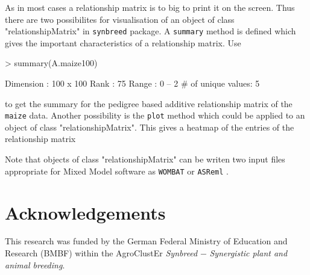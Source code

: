 \documentclass[a4paper,11pt]{article}
\begin{document}
As in most cases a relationship matrix is to big to print it on the screen. Thus there are two possibilites for visualisation of an object of class "relationshipMatrix" in \texttt{synbreed} package. A \texttt{summary} method is defined which gives the important characteristics of a relationship matrix. Use
\begin{Schunk}
\begin{Sinput}
> summary(A.maize100)
\end{Sinput}
\begin{Soutput}
Dimension         : 100 x 100 
Rank              : 75 
Range             : 0 -- 2 
# of unique values: 5 
\end{Soutput}
\end{Schunk}
to get the summary for the pedigree based additive relationship matrix of the \texttt{maize} data. Another possibility is the \texttt{plot} method which could be applied
to an object of class "relationshipMatrix". This gives a heatmap of the entries of the relationship matrix

Note that objects of class "relationshipMatrix" can be writen two input files appropriate for Mixed Model software as \texttt{WOMBAT} \citep{Meyer2006} or \texttt{ASReml} \citep{Gilmour2000}.


\section{Acknowledgements}

This research was funded by the German Federal Ministry of Education and
Research (BMBF) within the AgroClustEr \textit{Synbreed} $-$  \textit{Synergistic plant and
animal breeding}.

  
\end{document}

